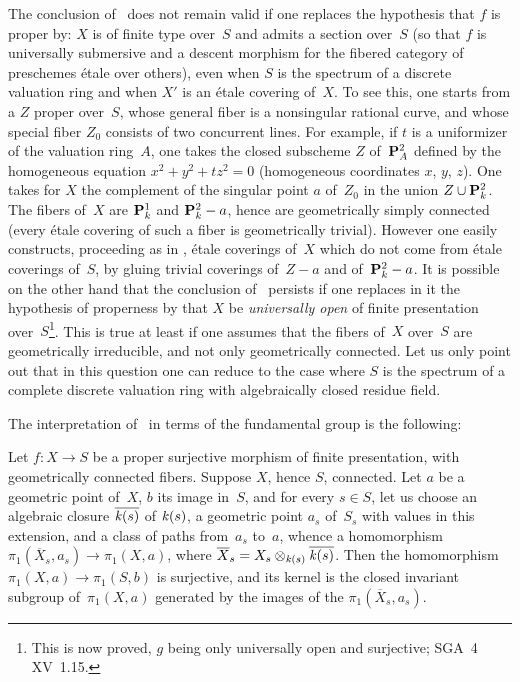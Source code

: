 \begin{remark}
\label{IX.6.10}
The conclusion of~ does not remain valid if one replaces
the hypothesis that $f$ is proper by: $X$ is of finite type over~$S$
and admits a section over~$S$ (so that $f$ is universally submersive
and a descent morphism for the fibered category of preschemes étale
over others), even when $S$ is the spectrum of a discrete valuation
ring and when $X'$ is an étale covering of~$X$. To see this, one
starts from a $Z$ proper over~$S$, whose general fiber
is a nonsingular rational curve, and whose special fiber $Z_0$
consists of two concurrent lines. For example, if $t$ is a uniformizer
of the valuation ring~$A$, one takes the closed subscheme $Z$
of~$\mathbf{P}_A^2$ defined by the homogeneous equation $x^2+y^2+tz^2=0$
(homogeneous coordinates $x$, $y$, $z$). One takes for $X$ the
complement of the singular point $a$ of~$Z_0$ in the union $Z\cup
\mathbf{P}_k^2$. The fibers of~$X$ are $\mathbf{P}_k^1$ and $\mathbf{P}_k^2 - a$, hence are
geometrically simply connected (\ie every étale covering of such a
fiber is geometrically trivial). However
one easily constructs, proceeding as in \No {}, étale
coverings of~$X$ which do not come from étale coverings of~$S$, by
gluing trivial coverings of~$Z-a$ and of~$\mathbf{P}_k^2-a$. It is possible
on the other hand that the conclusion of~ persists if one
replaces in it the hypothesis of properness by that $X$ be
\emph{universally open} of finite presentation
over~$S$\kern1pt\footnote{This is now proved, $g$ being only
universally open and surjective; \cf SGA~4 XV~1.15.}. This is true at
least if one assumes that the fibers of~$X$ over~$S$ are geometrically
irreducible, and not only geometrically connected. Let us only point
out that in this question one can reduce to the case where $S$ is the
spectrum of a complete discrete valuation ring with algebraically
closed residue field.
\end{remark}

The interpretation of~ in terms of the fundamental group is
the following:

\begin{corollary}
\label{IX.6.11}
Let $f\colon X\to S$ be a proper surjective morphism of finite
presentation, with geometrically connected fibers. Suppose $X$, hence
$S$, connected. Let $a$ be a geometric point of~$X$, $b$ its image
in~$S$, and for every $s\in S$, let us choose an algebraic closure
$\overline{\mathit{k}(s)}$ of $\mathit{k}(s)$, a geometric point $a_s$ of~$S_s$
with values in this extension, and a class of paths from~$a_s$ to~$a$,
whence a homomorphism $\pi_1(\overline X_s,a_s)\to \pi_1(X,a)$, where
$\overline X_s=X_s\otimes_{\mathit{k}(s)}\overline{\mathit{k}(s)}$. Then the
homomorphism $\pi_1(X,a)\to \pi_1(S,b)$ is surjective, and its kernel
is the closed invariant subgroup of~$\pi_1(X,a)$ generated by the
images of the $\pi_1(\overline X_s,a_s)$.
\end{corollary}

